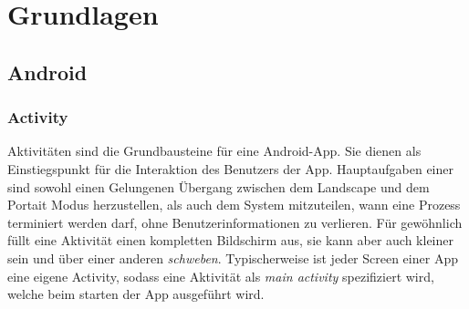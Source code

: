 \chapter{Grundlagen}

\section{Android}
\sectionauthor{\oliver}

\subsection{Activity}
Aktivitäten sind die Grundbausteine für eine Android-App. Sie dienen als 
Einstiegspunkt für die Interaktion des Benutzers der App. Hauptaufgaben einer 
 sind sowohl einen Gelungenen Übergang zwischen dem Landscape und 
dem Portait Modus herzustellen, als auch dem System mitzuteilen, wann eine 
Prozess terminiert werden darf, ohne Benutzerinformationen zu verlieren. Für 
gewöhnlich füllt eine Aktivität einen kompletten Bildschirm aus, sie kann aber 
auch kleiner sein und über einer anderen \emph{schweben}. Typischerweise ist 
jeder Screen einer App eine eigene Activity, sodass eine Aktivität als 
\emph{main activity} spezifiziert wird, welche beim starten der App ausgeführt 
wird.

